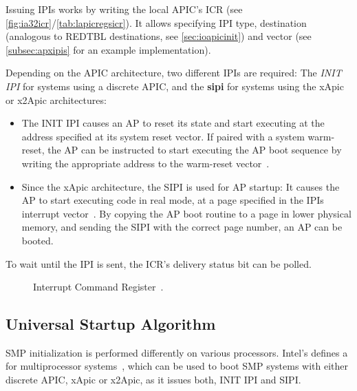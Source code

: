 Issuing IPIs works by writing the local APIC's ICR (see \autoref{fig:ia32icr}/\autoref{tab:lapicregsicr}).
It allows specifying IPI type, destination (analogous to REDTBL destinations, see \autoref{sec:ioapicinit}) and vector (see \autoref{subsec:apxipis} for an example implementation).

Depending on the APIC architecture, two different IPIs are required: The \textit{INIT IPI} for systems using a discrete APIC, and the \textbf{\gls{sipi}} for systems using the xApic or x2Apic architectures:

\begin{itemize}
  \item The INIT IPI causes an AP to reset its state and start executing at the address specified at its system reset vector.
        If paired with a system warm-reset, the AP can be instructed to start executing the AP boot sequence by writing the appropriate address to the warm-reset vector~\autocite[sec.~B.4.1]{mpspec}.
  \item Since the xApic architecture, the SIPI is used for AP startup: It causes the AP to start executing code in real mode, at a page specified in the IPIs interrupt vector~\autocite[sec.~B.4.2]{mpspec}.
        By copying the AP boot routine to a page in lower physical memory, and sending the SIPI with the correct page number, an AP can be booted.
\end{itemize}

To wait until the IPI is sent, the ICR's delivery status bit can be polled.

\begin{figure}[h]
  \centering
  \begin{subfigure}[b]{0.7\textwidth}
    
  \end{subfigure}
  \caption{Interrupt Command Register~\autocite[sec.~3.11.6.1]{ia32}.}
  \label{fig:ia32icr}
\end{figure}

\subsection{Universal Startup Algorithm}
\label{subsec:apstartup}

SMP initialization is performed differently on various processors.
Intel's  defines a  for multiprocessor systems~\autocite[sec.~B.4]{mpspec}, which can be used to boot SMP systems with either discrete APIC, xApic or x2Apic, as it issues both, INIT IPI and SIPI\@.

